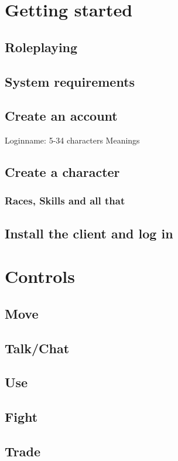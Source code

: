 \documentclass[a4paper,11pt]{scrreprt}
\begin{document}
\chapter{Getting started}
\section{Roleplaying}
\section{System requirements}
\section{Create an account}
Loginname: 5-34 characters
Meanings
\section{Create a character}
\subsection{Races, Skills and all that}
\section{Install the client and log in}
\chapter{Controls}
\section{Move}
\section{Talk/Chat}
\section{Use}
\section{Fight}
\section{Trade}
\section{}
\end{document}
